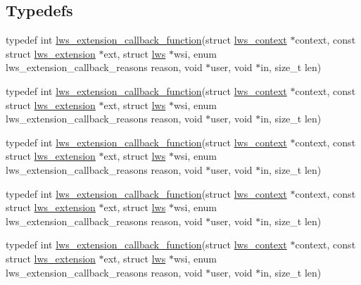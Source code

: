 \subsection*{Typedefs}
\begin{DoxyCompactItemize}
\item 
typedef int \hyperlink{group__extensions_gaae7169b2cd346b34fa33d0250db2afd0}{lws\+\_\+extension\+\_\+callback\+\_\+function}(struct \hyperlink{structlws__context}{lws\+\_\+context} $\ast$context, const struct \hyperlink{structlws__extension}{lws\+\_\+extension} $\ast$ext, struct \hyperlink{structlws}{lws} $\ast$wsi, enum lws\+\_\+extension\+\_\+callback\+\_\+reasons reason, void $\ast$user, void $\ast$in, size\+\_\+t len)
\item 
typedef int \hyperlink{group__extensions_gaae7169b2cd346b34fa33d0250db2afd0}{lws\+\_\+extension\+\_\+callback\+\_\+function}(struct \hyperlink{structlws__context}{lws\+\_\+context} $\ast$context, const struct \hyperlink{structlws__extension}{lws\+\_\+extension} $\ast$ext, struct \hyperlink{structlws}{lws} $\ast$wsi, enum lws\+\_\+extension\+\_\+callback\+\_\+reasons reason, void $\ast$user, void $\ast$in, size\+\_\+t len)
\item 
typedef int \hyperlink{group__extensions_gaae7169b2cd346b34fa33d0250db2afd0}{lws\+\_\+extension\+\_\+callback\+\_\+function}(struct \hyperlink{structlws__context}{lws\+\_\+context} $\ast$context, const struct \hyperlink{structlws__extension}{lws\+\_\+extension} $\ast$ext, struct \hyperlink{structlws}{lws} $\ast$wsi, enum lws\+\_\+extension\+\_\+callback\+\_\+reasons reason, void $\ast$user, void $\ast$in, size\+\_\+t len)
\item 
typedef int \hyperlink{group__extensions_gaae7169b2cd346b34fa33d0250db2afd0}{lws\+\_\+extension\+\_\+callback\+\_\+function}(struct \hyperlink{structlws__context}{lws\+\_\+context} $\ast$context, const struct \hyperlink{structlws__extension}{lws\+\_\+extension} $\ast$ext, struct \hyperlink{structlws}{lws} $\ast$wsi, enum lws\+\_\+extension\+\_\+callback\+\_\+reasons reason, void $\ast$user, void $\ast$in, size\+\_\+t len)
\item 
typedef int \hyperlink{group__extensions_gaae7169b2cd346b34fa33d0250db2afd0}{lws\+\_\+extension\+\_\+callback\+\_\+function}(struct \hyperlink{structlws__context}{lws\+\_\+context} $\ast$context, const struct \hyperlink{structlws__extension}{lws\+\_\+extension} $\ast$ext, struct \hyperlink{structlws}{lws} $\ast$wsi, enum lws\+\_\+extension\+\_\+callback\+\_\+reasons reason, void $\ast$user, void $\ast$in, size\+\_\+t len)

\end{DoxyCompactItemize}

